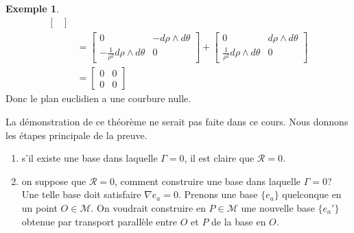 \documentclass[a4paper,11pt]{report}
\theoremstyle{definition}
\theoremstyle{plain}
\theoremstyle{definition}
\newtheorem{exmp}{Exemple}[chapter]
\theoremstyle{remark}
\newcommand{\M}{\mathscr{M}}
\begin{document}
\begin{exmp}
\begin{align}
\begin{bmatrix}
                        \end{bmatrix}\\
                        &= \begin{bmatrix}
                            0 & -d\rho\wedge d\theta \\
                            -\frac{1}{\rho^2}d\rho\wedge d\theta & 0
                        \end{bmatrix}+
                        \begin{bmatrix}
                            0 & d\rho\wedge d\theta \\
                            \frac{1}{\rho^2}d\rho\wedge d\theta & 0
                        \end{bmatrix}\\
                        &= 
                        \begin{bmatrix}
                            0 & 0 \\
                            0 & 0
                        \end{bmatrix}
                    \end{align}
                    Donc le plan euclidien a une courbure nulle.
                \end{exmp}
                
                La démonstration de ce théorème ne serait pas faite dans ce cours. Nous donnons les étapes principale de la preuve.
                \begin{enumerate}[label = \textit{\roman*)}]
                    \item s'il existe une base dans laquelle $\Gamma = 0$, il est claire que $\mathscr{R} = 0$.
                    \item on suppose que $\mathscr{R} = 0$, comment construire une base dans laquelle $\Gamma = 0$?  Une telle base doit satisfaire $\nabla e_a = 0$. Prenons une base $\{e_a\}$ quelconque en un point $O\in\M$. On voudrait construire en $P\in\M$ une nouvelle base $\{e_a'\}$ obtenue par transport parallèle entre $O$ et $P$ de la base en $O$. 
                \end{enumerate}
                
\end{document}
